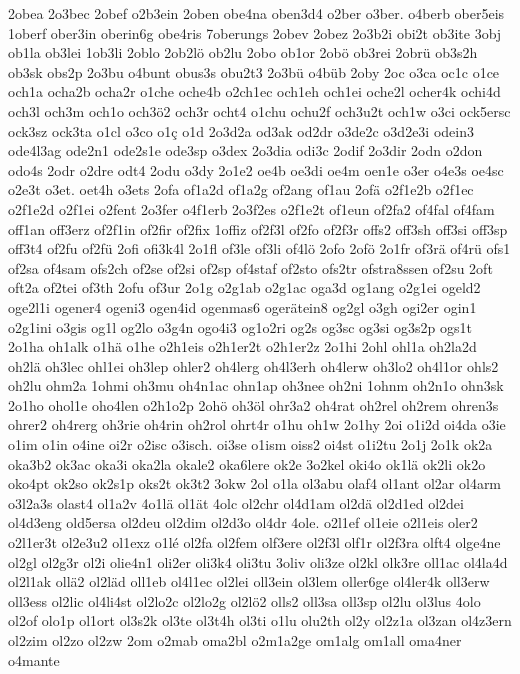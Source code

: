 {2obea
2o3bec
2obef
o2b3ein
2oben
obe4na
oben3d4
o2ber
o3ber.
o4berb
ober5eis
1oberf
ober3in
oberin6g
obe4ris
7oberungs
2obev
2obez
2o3b2i
obi2t
ob3ite
3obj
ob1la
ob3lei
1ob3li
2oblo
2ob2lö
ob2lu
2obo
ob1or
2obö
ob3rei
2obrü
ob3s2h
ob3sk
obs2p
2o3bu
o4bunt
obus3s
obu2t3
2o3bü
o4büb
2oby
2oc
o3ca
oc1c
o1ce
och1a
ocha2b
ocha2r
o1che
oche4b
o2ch1ec
och1eh
och1ei
oche2l
ocher4k
ochi4d
och3l
och3m
och1o
och3ö2
och3r
ocht4
o1chu
ochu2f
och3u2t
och1w
o3ci
ock5ersc
ock3sz
ock3ta
o1cl
o3co
o1ç
o1d
2o3d2a
od3ak
od2dr
o3de2c
o3d2e3i
odein3
ode4l3ag
ode2n1
ode2s1e
ode3sp
o3dex
2o3dia
odi3c
2odif
2o3dir
2odn
o2don
odo4s
2odr
o2dre
odt4
2odu
o3dy
2o1e2
oe4b
oe3di
oe4m
oen1e
o3er
o4e3s
oe4sc
o2e3t
o3et.
oet4h
o3ets
2ofa
of1a2d
of1a2g
of2ang
of1au
2ofä
o2f1e2b
o2f1ec
o2f1e2d
o2f1ei
o2fent
2o3fer
o4f1erb
2o3f2es
o2f1e2t
of1eun
of2fa2
of4fal
of4fam
off1an
off3erz
of2f1in
of2fir
of2fix
1offiz
of2f3l
of2fo
of2f3r
offs2
off3sh
off3si
off3sp
off3t4
of2fu
of2fü
2ofi
ofi3k4l
2o1fl
of3le
of3li
of4lö
2ofo
2ofö
2o1fr
of3rä
of4rü
ofs1
of2sa
of4sam
ofs2ch
of2se
of2si
of2sp
of4staf
of2sto
ofs2tr
ofstra8ssen
of2su
2oft
oft2a
of2tei
of3th
2ofu
of3ur
2o1g
o2g1ab
o2g1ac
oga3d
og1ang
o2g1ei
ogeld2
oge2l1i
ogener4
ogeni3
ogen4id
ogenmas6
ogerätein8
og2gl
o3gh
ogi2er
ogin1
o2g1ini
o3gis
og1l
og2lo
o3g4n
ogo4i3
og1o2ri
og2s
og3sc
og3si
og3s2p
ogs1t
2o1ha
oh1alk
o1hä
o1he
o2h1eis
o2h1er2t
o2h1er2z
2o1hi
2ohl
ohl1a
oh2la2d
oh2lä
oh3lec
ohl1ei
oh3lep
ohler2
oh4lerg
oh4l3erh
oh4lerw
oh3lo2
oh4l1or
ohls2
oh2lu
ohm2a
1ohmi
oh3mu
oh4n1ac
ohn1ap
oh3nee
oh2ni
1ohnm
oh2n1o
ohn3sk
2o1ho
ohol1e
oho4len
o2h1o2p
2ohö
oh3öl
ohr3a2
oh4rat
oh2rel
oh2rem
ohren3s
ohrer2
oh4rerg
oh3rie
oh4rin
oh2rol
ohrt4r
o1hu
oh1w
2o1hy
2oi
o1i2d
oi4da
o3ie
o1im
o1in
o4ine
oi2r
o2isc
o3isch.
oi3se
o1ism
oiss2
oi4st
o1i2tu
2o1j
2o1k
ok2a
oka3b2
ok3ac
oka3i
oka2la
okale2
oka6lere
ok2e
3o2kel
oki4o
ok1lä
ok2li
ok2o
oko4pt
ok2so
ok2s1p
oks2t
ok3t2
3okw
2ol
o1la
ol3abu
olaf4
ol1ant
ol2ar
ol4arm
o3l2a3s
olast4
ol1a2v
4o1lä
ol1ät
4olc
ol2chr
ol4d1am
ol2dä
ol2d1ed
ol2dei
ol4d3eng
old5ersa
ol2deu
ol2dim
ol2d3o
ol4dr
4ole.
o2l1ef
ol1eie
o2l1eis
oler2
o2l1er3t
ol2e3u2
ol1exz
o1lé
ol2fa
ol2fem
olf3ere
ol2f3l
olf1r
ol2f3ra
olft4
olge4ne
ol2gl
ol2g3r
ol2i
olie4n1
oli2er
oli3k4
oli3tu
3oliv
oli3ze
ol2kl
olk3re
oll1ac
ol4la4d
ol2l1ak
ollä2
ol2läd
oll1eb
ol4l1ec
ol2lei
oll3ein
ol3lem
oller6ge
ol4ler4k
oll3erw
oll3ess
ol2lic
ol4li4st
ol2lo2c
ol2lo2g
ol2lö2
olls2
oll3sa
oll3sp
ol2lu
ol3lus
4olo
ol2of
olo1p
ol1ort
ol3s2k
ol3te
ol3t4h
ol3ti
o1lu
olu2th
ol2y
ol2z1a
ol3zan
ol4z3ern
ol2zim
ol2zo
ol2zw
2om
o2mab
oma2bl
o2m1a2ge
om1alg
om1all
oma4ner
o4mante
}
